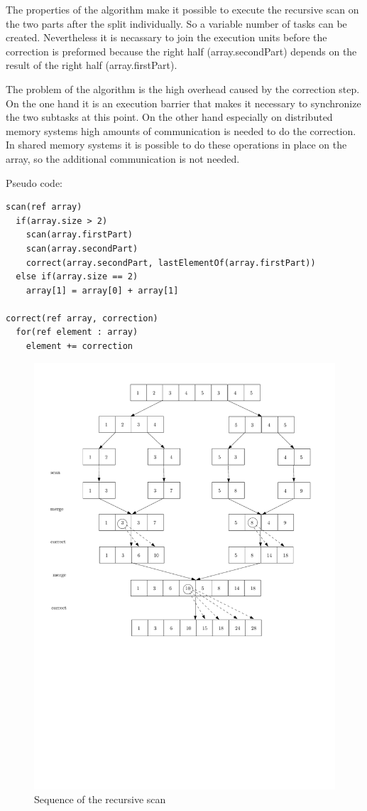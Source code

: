 \documentclass[a4paper,twoside,11pt]{article}
\begin{document}
The properties of the algorithm make it possible to execute the recursive scan on the two parts after the split individually. So a variable number of tasks can be created. Nevertheless it is necassary to join the execution units before the correction is preformed because the right half (array.secondPart) depends on the result of the right half (array.firstPart). 

The problem of the algorithm is the high overhead caused by the correction step. On the one hand it is an execution barrier that makes it necessary to synchronize the two subtasks at this point. On the other hand especially on distributed memory systems high amounts of communication is needed to do the correction. In shared memory systems it is possible to do these operations in place on the array, so the additional communication is not needed.

Pseudo code:
\begin{verbatim}
scan(ref array)
  if(array.size > 2)
    scan(array.firstPart)
    scan(array.secondPart)
    correct(array.secondPart, lastElementOf(array.firstPart))
  else if(array.size == 2)
    array[1] = array[0] + array[1]
	
correct(ref array, correction)
  for(ref element : array)
    element += correction
\end{verbatim}

\begin{figure}[hbtp]
\centering
\label{fig:para_algo}
\includegraphics[scale=.75]{recur3}
\caption{Sequence of the recursive scan}
\end{figure}
\end{document}
